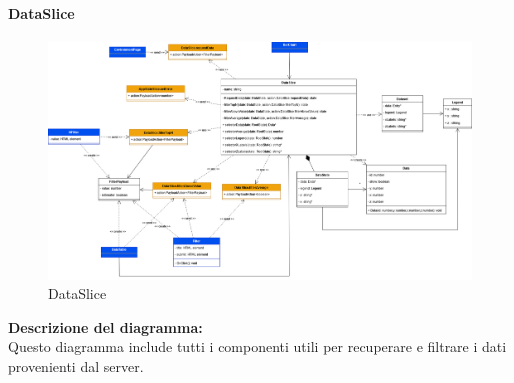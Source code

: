 \paragraph{DataSlice}
\begin{figure}[h!] \centering
    \includegraphics[scale=0.3]{template/images/uml_front/logic/dataslice.png}
    \caption{DataSlice}
\end{figure}
\textbf{Descrizione del diagramma:}\\
Questo diagramma include tutti i componenti utili per recuperare e filtrare i dati provenienti dal server.
